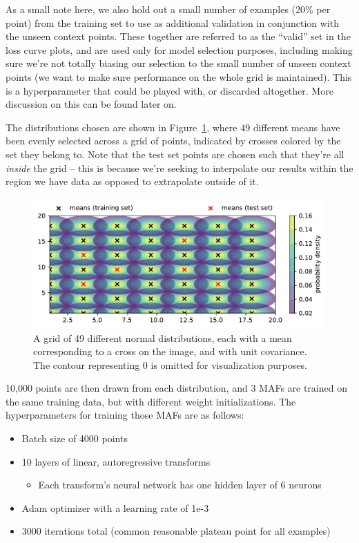 \documentclass[
  11pt,
  numbers=noendperiod]{book}
\providecommand{\tightlist}{%
  \setlength{\itemsep}{0pt}\setlength{\parskip}{0pt}}\usepackage{longtable,booktabs,array}
\begin{document}
As a small note here, we also hold out a small number of examples (20\%
per point) from the training set to use as additional validation in
conjunction with the unseen context points. These together are referred
to as the ``valid'' set in the loss curve plots, and are used only for
model selection purposes, including making sure we're not totally
biasing our selection to the small number of unseen context points (we
want to make sure performance on the whole grid is maintained). This is
a hyperparameter that could be played with, or discarded altogether.
More discussion on this can be found later on.

The distributions chosen are shown in Figure~\ref{fig-normalgrid}, where
49 different means have been evenly selected across a grid of points,
indicated by crosses colored by the set they belong to. Note that the
test set points are chosen such that they're all \emph{inside} the grid
-- this is because we're seeking to interpolate our results within the
region we have data as opposed to extrapolate outside of it.

\begin{figure}

{\centering \includegraphics{./images/flows/simple/simple_data_dists.pdf}

}

\caption{\label{fig-normalgrid}A grid of 49 different normal
distributions, each with a mean corresponding to a cross on the image,
and with unit covariance. The contour representing 0 is omitted for
visualization purposes.}

\end{figure}

10,000 points are then drawn from each distribution, and 3 MAFs are
trained on the same training data, but with different weight
initializations. The hyperparameters for training those MAFs are as
follows:

\begin{itemize}
\tightlist
\item
  Batch size of 4000 points
\item
  10 layers of linear, autoregressive transforms

  \begin{itemize}
  \tightlist
  \item
    Each transform's neural network has one hidden layer of 6 neurons
  \end{itemize}
\item
  Adam optimizer with a learning rate of 1e-3
\item
  3000 iterations total (common reasonable plateau point for all
  examples)
\end{itemize}
\end{document}
